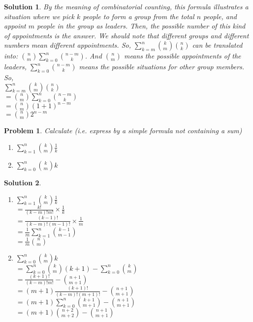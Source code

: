 \documentclass[12pt]{article}
\newtheorem*{solution}{Solution}
\newtheorem{hw}{Problem}
\begin{document}
\begin{solution}
    By the meaning of combinatorial counting, this formula illustrates a situation where we pick $k$ people to form a group from the total $n$ people, and appoint $m$ people in the group as leaders.
    Then, the possible number of this kind of appointments is the answer. We should note that different groups and different numbers mean different appointments. So, $\sum_{k=m}^n {k \choose m}{n \choose k}$ can be translated into:
    ${n\choose m}\sum_{k=0}^n {n-m\choose k}$. And ${n\choose m}$ means the possible appointments of the leaders, $\sum_{k=0}^n {n-m\choose k}$ means the possible situations for other group members. So,
    \\$\sum_{k=m}^n {k \choose m}{n \choose k}$
    \\$={n\choose m}\sum_{k=0}^n {n-m\choose k}$
    \\$={n\choose m}(1+1)^{n-m}$
    \\$={n\choose m}2^{n-m}$
\end{solution}

\begin{hw}
Calculate (i.e. express by a simple formula not containing a sum)
\begin{enumerate}
  \item $\sum_{k=1}^n {k\choose m}\frac{1}{k}$
  \item $\sum_{k=0}^n{k\choose m}k$
\end{enumerate}
\end{hw}

\begin{solution}
    \begin{enumerate}
        \item $\sum_{k=1}^n {k\choose m}\frac{1}{k}$
        \\$=\frac{k!}{(k-m)!m!}\times \frac{1}{k} $
        \\$=\frac{(k-1)!}{(k-m)!(m-1)!}\times \frac{1}{m} $
        \\$=\frac{1}{m}\sum_{k=1}^n {k-1\choose m-1}$
        \\$=\frac{1}{m}{n\choose m}$
        \item $\sum_{k=0}^n{k\choose m}k$
        \\$=\sum_{k=0}^n{k\choose m}(k+1)-\sum_{k=0}^n{k\choose m}$
        \\$=\frac{(k+1)!}{(k-m)!m!}-{n+1\choose m+1}$
        \\$=(m+1)\frac{(k+1)!}{(k-m)!(m+1)!}-{n+1\choose m+1}$
        \\$=(m+1)\sum_{k=0}^n {k+1\choose m+1}-{n+1\choose m+1}$
        \\$=(m+1){n+2\choose m+2}-{n+1\choose m+1}$
    \end{enumerate}
\end{solution}
\end{document}
